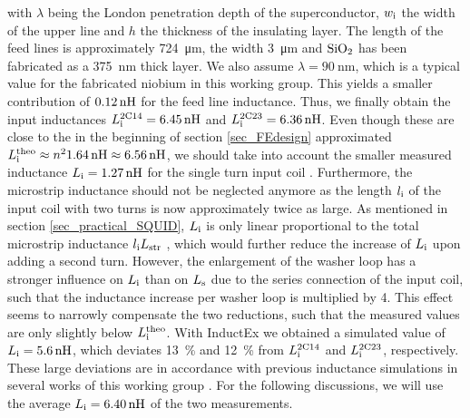 with $\lambda$ being the London penetration depth of the superconductor, $w_{\rm i}$ the width of the upper line and $h$ the thickness of the insulating layer. The length of the feed lines is approximately \qty{724}{\um}, the width \qty{3}{\um} and $\rm{SiO_2}$ has been fabricated as a \qty{375}{\nm} thick layer. We also assume $\lambda=\qty{90}{\nm}$, which is a typical value for the fabricated niobium in this working group. This yields a smaller contribution of $\qty{0.12}{\nH}$ for the feed line inductance. Thus, we finally obtain the input inductances $L_{\rm i}^{\rm 2C14}=\qty{6.45}{\nH}$ and $L_{\rm i}^{\rm 2C23}=\qty{6.36}{\nH}$. Even though these are close to the in the beginning of section \ref{sec_FEdesign} approximated $L_{\rm i}^{\rm theo}\approx n^{2}\qty{1.64}{\nH}\approx\qty{6.56}{\nH}$, we should take into account the smaller measured inductance $L_{\rm i}=\qty{1.27}{\nH}$ for the single turn input coil \cite{Bauer2022}. Furthermore, the microstrip inductance should not be neglected anymore as the length $l_{\rm i}$ of the input coil with two turns is now approximately twice as large. As mentioned in section \ref{sec_practical_SQUID}, $L_{\rm i}$ is only linear proportional to the total microstrip inductance $l_{\rm i}L_{\rm str}$ \cite{Ketchen1991}, which would further reduce the increase of $L_{\rm i}$ upon adding a second turn. However, the enlargement of the washer loop has a stronger influence on $L_{\rm i}$ than on $L_{\rm s}$ due to the series connection of the input coil, such that the inductance increase per washer loop is multiplied by 4. This effect seems to narrowly compensate the two reductions, such that the measured values are only slightly below $L_{\rm i}^{\rm theo}$. With InductEx we obtained a simulated value of $L_{\rm i}=\qty{5.6}{\nH}$, which deviates \qty{13}{\percent} and \qty{12}{\percent} from $L_{\rm i}^{\rm 2C14}$ and $L_{\rm i}^{\rm 2C23}$, respectively. These large deviations are in accordance with previous inductance simulations in several works of this working group \cite{Ferring2015, Bauer2022}. For the following discussions, we will use the average $L_{\rm i}=\qty{6.40}{\nH}$ of the two measurements. \\


